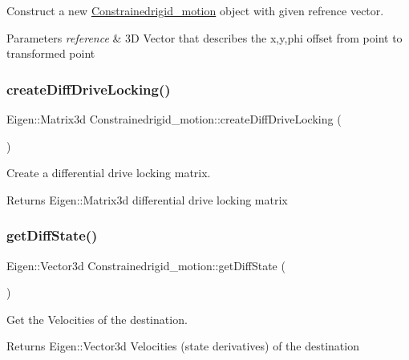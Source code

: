 Construct a new \hyperlink{classConstrainedrigid__motion}{Constrainedrigid\+\_\+motion} object with given refrence vector. 


\begin{DoxyParams}{Parameters}
{\em reference} & 3D Vector that describes the x,y,phi offset from point to transformed point \\
\hline
\end{DoxyParams}
\mbox{\label{group__RigidMotion_ga8f1f65bf1494ab1ddc8fe3d2af5353a4}} 
\subsubsection{\texorpdfstring{create\+Diff\+Drive\+Locking()}{createDiffDriveLocking()}}
{\footnotesize\ttfamily Eigen\+::\+Matrix3d Constrainedrigid\+\_\+motion\+::create\+Diff\+Drive\+Locking (\begin{DoxyParamCaption}{ }\end{DoxyParamCaption})\hspace{0.3cm}{\ttfamily [static]}}



Create a differential drive locking matrix. 

\begin{DoxyReturn}{Returns}
Eigen\+::\+Matrix3d differential drive locking matrix 
\end{DoxyReturn}
\mbox{\label{group__RigidMotion_ga8540758697945dc27502fcb557bb4871}} 
\subsubsection{\texorpdfstring{get\+Diff\+State()}{getDiffState()}}
{\footnotesize\ttfamily Eigen\+::\+Vector3d Constrainedrigid\+\_\+motion\+::get\+Diff\+State (\begin{DoxyParamCaption}{ }\end{DoxyParamCaption})}



Get the Velocities of the destination. 

\begin{DoxyReturn}{Returns}
Eigen\+::\+Vector3d Velocities (state derivatives) of the destination 
\end{DoxyReturn}
\mbox{\label{group__RigidMotion_ga1a34b67dd58d3137628811dfab7f54a1}} 
